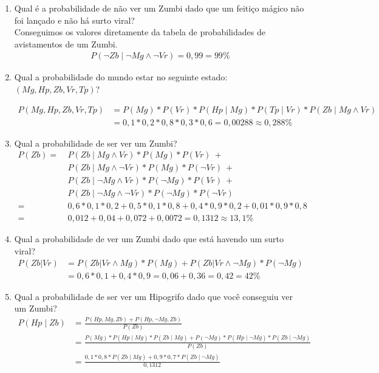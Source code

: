 \documentclass{article}
\begin{document}
\begin{enumerate}
    \item Qual é a probabilidade de não ver um Zumbi dado que um feitiço mágico não foi lançado e não há surto viral? \\
        Conseguimos os valores diretamente da tabela de probabilidades de avistamentos de um Zumbi.
        \begin{align*}
            P(\neg Zb \mid \neg Mg \land \neg Vr) = 0,99 = 99\%
        \end{align*}
    
    \item Qual a probabilidade do mundo estar no seguinte estado: $(Mg, Hp, Zb, Vr, Tp)$?
    
        \begin{align*}
            P(Mg, Hp, Zb, Vr, Tp)&=P(Mg)*P(Vr)*P(Hp \mid Mg)*P(Tp \mid Vr)*P(Zb \mid Mg \land Vr) \\
                                 &= 0,1*0,2*0,8*0,3*0,6 = 0,00288 \approx 0,288\%
        \end{align*}
    
    \item Qual a probabilidade de ser ver um Zumbi?
        \begin{align*}
            P(Zb) =\ &P(Zb \mid Mg \land Vr)*P(Mg)*P(Vr)\ + \\
                    &P(Zb \mid Mg \land \neg Vr)*P(Mg)*P(\neg Vr)\ + \\
                    &P(Zb \mid \neg Mg \land Vr)*P(\neg Mg)*P(Vr)\ + \\
                    &P(Zb \mid \neg Mg \land \neg Vr)*P(\neg Mg)*P(\neg Vr) \\
                    =\ &0,6 * 0,1 * 0,2 + 0,5 * 0,1 * 0,8 + 0,4 * 0,9 * 0,2 + 0,01 * 0,9 * 0,8 \\
                    =\ &0,012 + 0,04 + 0,072 + 0,0072 = 0,1312 \approx 13,1\%
        \end{align*}
    
    \item Qual a probabilidade de ver um Zumbi dado que está havendo um surto viral?
        \begin{align*}
            P(Zb|Vr) &= P(Zb|Vr \land Mg)*P(Mg)+P(Zb|Vr \land \neg Mg)*P(\neg Mg) \\
                     &= 0,6 * 0,1 + 0,4 * 0,9 = 0,06 + 0,36 = 0,42 = 42\%
        \end{align*}
    
    \item Qual a probabilidade de ser ver um Hipogrifo dado que você conseguiu ver um Zumbi?
        \begin{align*}
            P(Hp \mid Zb) &= \frac{P(Hp, Mg, Zb)+P(Hp, \neg Mg, Zb)}{P(Zb)} \\
                          &= \frac{P(Mg)*P(Hp \mid Mg)*P(Zb \mid Mg)+P(\neg Mg)*P(Hp \mid \neg Mg)*P(Zb \mid \neg Mg)}{P(Zb)} \\
                          &= \frac{0,1*0,8*P(Zb \mid Mg)+0,9*0,7*P(Zb \mid \neg Mg)}{0,1312}
        \end{align*}
        

\end{enumerate}
\end{document}
